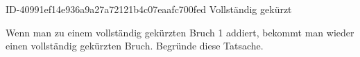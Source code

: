 \begin{exercise}
      {ID-40991ef14e936a9a27a72121b4c07eaafc700fed}
      {Vollständig gekürzt}
  \ifproblem\problem\par
    Wenn man zu einem vollständig gekürzten Bruch 1 addiert, bekommt man
    wieder einen vollständig gekürzten Bruch. Begründe diese Tatsache.
  \fi
\end{exercise}
